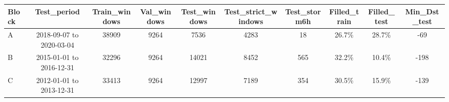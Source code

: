 \begin{tabular}{lccccccccc}
\toprule
Block & Test\_period & Train\_windows & Val\_windows & Test\_windows & Test\_strict\_windows & Test\_storm6h & Filled\_train & Filled\_test & Min\_Dst\_test \\
\midrule
A & 2018-09-07 to 2020-03-04 & 38909 & 9264 & 7536 & 4283 & 18 & 26.7\% & 28.7\% & -69 \\
B & 2015-01-01 to 2016-12-31 & 32296 & 9264 & 14021 & 8452 & 565 & 32.2\% & 10.4\% & -198 \\
C & 2012-01-01 to 2013-12-31 & 33413 & 9264 & 12997 & 7189 & 354 & 30.5\% & 15.9\% & -139 \\
\bottomrule
\end{tabular}
